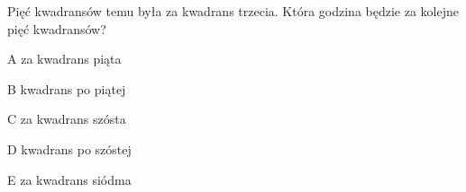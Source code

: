 \begin{tresc}
Pięć kwadransów temu była za kwadrans trzecia. Która godzina będzie za kolejne pięć kwadransów?
\end{tresc}
\begin{wariant}{A} za kwadrans piąta \end{wariant}
\begin{wariant}{B} kwadrans po piątej \end{wariant}
\begin{wariant}{C} za kwadrans szósta \end{wariant}
\begin{wariant}{D} kwadrans po szóstej \end{wariant}
\begin{wariant}{E} za kwadrans siódma \end{wariant}
